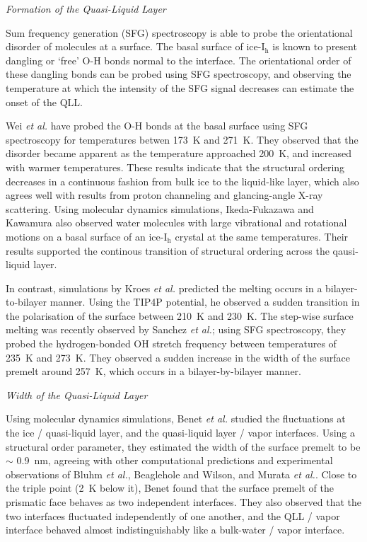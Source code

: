 \begin{flushleft}
\textit{Formation of the Quasi-Liquid Layer}
\end{flushleft}

Sum frequency generation (SFG) spectroscopy is able to probe the
orientational disorder of molecules at a surface. The basal surface of
ice-I$_\mathrm{h}$ is known to present dangling or `free' O-H bonds
normal to the interface. The orientational order of these dangling
bonds can be probed using SFG spectroscopy, and observing the
temperature at which the intensity of the SFG signal decreases can
estimate the onset of the QLL.

Wei \textit{et al.} have probed the O-H bonds at the basal surface
using SFG spectroscopy for temperatures betwen 173~K and
271~K.\cite{Wei2001,Wei2002} They observed that the disorder became
apparent as the temperature approached 200~K, and increased with
warmer temperatures.  These results indicate that the structural
ordering decreases in a continuous fashion from bulk ice to the
liquid-like layer, which also agrees well with results from proton
channeling and glancing-angle X-ray
scattering.\cite{Golecki1978,Dosch1995} Using molecular dynamics
simulations, Ikeda-Fukazawa and Kawamura also observed water molecules
with large vibrational and rotational motions on a basal surface of an
ice-I$_\mathrm{h}$ crystal at the same
temperatures.\cite{Ikeda-Fukazawa2004} Their results supported the
continous transition of structural ordering across the qausi-liquid
layer.

In contrast, simulations by Kroes \textit{et al.}  predicted the
melting occurs in a bilayer-to-bilayer manner.\cite{Kroes1992} Using
the TIP4P potential, he observed a sudden transition in the
polarisation of the surface between 210~K and 230~K.  The step-wise
surface melting was recently observed by Sanchez \textit{et al.};
using SFG spectroscopy, they probed the hydrogen-bonded OH stretch
frequency between temperatures of 235~K and 273~K.\cite{Sanchez2017}
They observed a sudden increase in the width of the surface premelt
around 257~K, which occurs in a bilayer-by-bilayer manner. 

\begin{flushleft}
\textit{Width of the Quasi-Liquid Layer}
\end{flushleft}

Using molecular dynamics simulations, Benet \textit{et al.} studied
the fluctuations at the ice / quasi-liquid layer, and the quasi-liquid
layer / vapor interfaces.\cite{Benet2016} Using a structural order
parameter, they estimated the width of the surface premelt to be
$\sim$ 0.9~nm, agreeing with other computational
predictions\cite{Conde2008,Bishop2009,Pan2011} and experimental
observations of Bluhm \textit{et al.}\cite{Bluhm2002}, Beaglehole and
Wilson\cite{Beaglehole1993}, and Murata \textit{et
  al.}\cite{Murata2015}. Close to the triple point (2~K below it),
Benet found that the surface premelt of the prismatic face behaves as
two independent interfaces. They also observed that the two interfaces
fluctuated independently of one another, and the QLL / vapor interface
behaved almost indistinguishably like a bulk-water / vapor interface.

